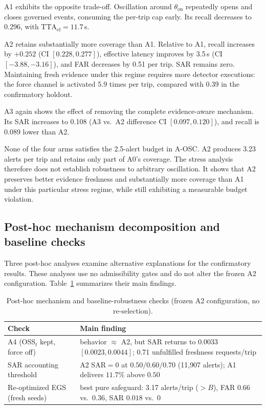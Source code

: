 \documentclass[conference]{IEEEtran}
\newcommand{\ttaef}{\mathrm{TTA}_{\mathrm{ef}}}
\begin{document}
A1 exhibits the opposite trade-off. Oscillation around
$\theta_{\mathrm{on}}$ repeatedly opens and closes governed events,
consuming the per-trip cap early. Its recall decreases to 0.296, with
$\ttaef=11.7$\,s.

A2 retains substantially more coverage than A1. Relative to A1, recall
increases by $+0.252$ (CI $[0.228,0.277]$), effective latency improves
by 3.5\,s (CI $[-3.88,-3.16]$), and FAR decreases by 0.51 per trip.
SAR remains zero. Maintaining fresh evidence under this regime requires
more detector executions: the force channel is activated 5.9 times per
trip, compared with 0.39 in the confirmatory holdout.

A3 again shows the effect of removing the complete evidence-aware
mechanism. Its SAR increases to 0.108
(A3 vs.\ A2 difference CI $[0.097,0.120]$), and recall is 0.089 lower
than A2.

None of the four arms satisfies the 2.5-alert budget in A-OSC. A2
produces 3.23 alerts per trip and retains only part of A0's coverage.
The stress analysis therefore does not establish robustness to arbitrary
oscillation. It shows that A2 preserves better evidence freshness and
substantially more coverage than A1 under this particular stress regime,
while still exhibiting a measurable budget violation.

\subsection{Post-hoc mechanism decomposition and baseline checks}
\label{sec:mechanism}

Three post-hoc analyses examine alternative explanations for the
confirmatory results. These analyses use no admissibility gates and do
not alter the frozen A2 configuration. Table~\ref{tab:posthoc} summarizes
their main findings.

\begin{table}[!t]
\caption{Post-hoc mechanism and baseline-robustness checks (frozen A2
configuration, no re-selection).}
\label{tab:posthoc}
\centering\scriptsize
\setlength{\tabcolsep}{4pt}
\begin{tabular}{@{}lp{4.6cm}@{}}
\toprule
Check & Main finding\\
\midrule
A4 (OSS$_t$ kept, force off) &
behavior $\approx$ A2, but SAR returns to
$0.0033$ $[0.0023,0.0044]$; 0.71 unfulfilled freshness requests/trip\\
SAR accounting threshold &
A2 SAR${}=0$ at $0.50/0.60/0.70$ (11{,}907 alerts);
A1 delivers $11.7\%$ above $0.50$\\
Re-optimized EGS (fresh seeds) &
best pure safeguard: 3.17 alerts/trip ($>B$),
FAR $0.66$ vs.\ $0.36$, SAR $0.018$ vs.\ $0$\\
\bottomrule
\end{tabular}
\end{table}
\end{document}
